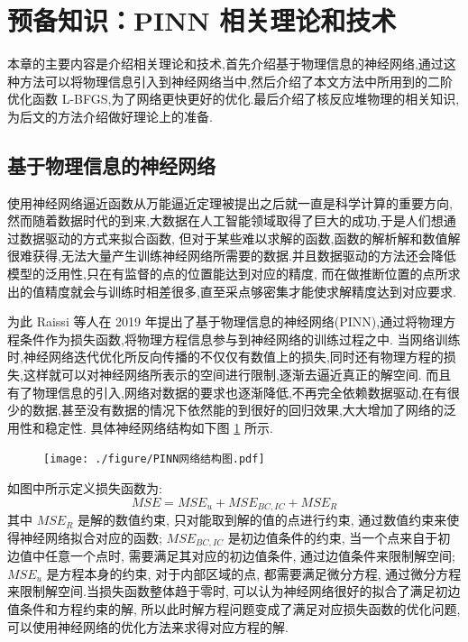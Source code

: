 \documentclass{Sichuan Normal University}
\begin{document}
\section{预备知识：PINN 相关理论和技术}
本章的主要内容是介绍相关理论和技术,首先介绍基于物理信息的神经网络,通过这种方法可以将物理信息引入到神经网络当中,然后介绍了本文方法中所用到的二阶优化函数 L-BFGS,为了网络更快更好的优化.最后介绍了核反应堆物理的相关知识,为后文的方法介绍做好理论上的准备.
\subsection{基于物理信息的神经网络}
使用神经网络逼近函数从万能逼近定理被提出之后就一直是科学计算的重要方向,然而随着数据时代的到来,大数据在人工智能领域取得了巨大的成功,于是人们想通过数据驱动的方式来拟合函数,
但对于某些难以求解的函数,函数的解析解和数值解很难获得,无法大量产生训练神经网络所需要的数据.并且数据驱动的方法还会降低模型的泛用性,只在有监督的点的位置能达到对应的精度,
而在做推断位置的点所求出的值精度就会与训练时相差很多,直至采点够密集才能使求解精度达到对应要求.

为此 Raissi 等人在 2019 年提出了基于物理信息的神经网络(PINN)\cite{raissiPhysicsinformedNeuralNetworks2019},通过将物理方程条件作为损失函数,将物理方程信息参与到神经网络的训练过程之中.
当网络训练时,神经网络迭代优化所反向传播的不仅仅有数值上的损失,同时还有物理方程的损失,这样就可以对神经网络所表示的空间进行限制,逐渐去逼近真正的解空间.
而且有了物理信息的引入,网络对数据的要求也逐渐降低,不再完全依赖数据驱动,在有很少的数据,甚至没有数据的情况下依然能的到很好的回归效果,大大增加了网络的泛用性和稳定性.
具体神经网络结构如下图 \ref{fig:PINN Network Structure} 所示.
\begin{figure}[H]
    \centering
    \texttt{[image: ./figure/PINN网络结构图.pdf]}
    \label{fig:PINN Network Structure}
    \end{figure}
如图中所示定义损失函数为:
\begin{equation}
    M S E=M S E_u+M S E_{B C, I C}+M S E_R
    \label{eq:损失函数}  
\end{equation}其中 $M S E_R$ 是解的数值约束, 只对能取到解的值的点进行约束, 通过数值约束来使得神经网络拟合对应的函数; $M S E_{B C, I C}$ 是初边值条件的约束, 当一个点来自于初边值中任意一个点时, 需要满足其对应的初边值条件, 通过边值条件来限制解空间; 
$M S E_u$ 是方程本身的约束, 对于内部区域的点, 都需要满足微分方程, 通过微分方程来限制解空间.当损失函数整体趋于零时, 可以认为神经网络很好的拟合了满足初边值条件和方程约束的解, 所以此时解方程问题变成了满足对应损失函数的优化问题, 可以使用神经网络的优化方法来求得对应方程的解.
\end{document}
